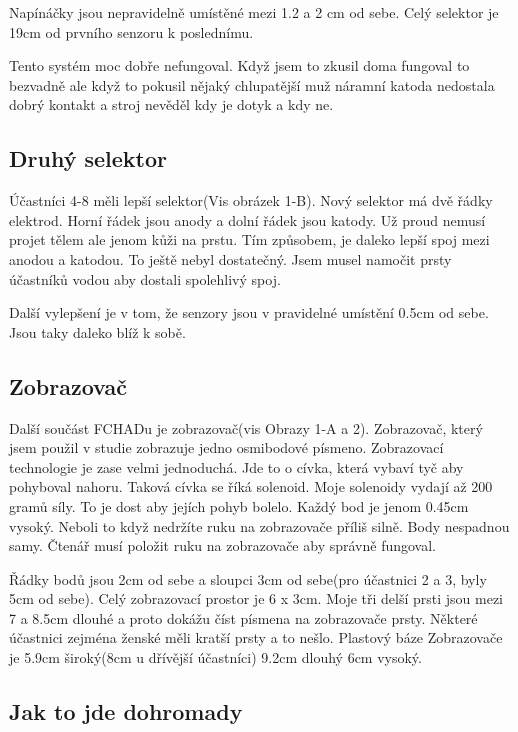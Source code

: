 Napínáčky jsou nepravidelně umístěné mezi 1.2 a 2 cm od sebe.  Celý selektor je 19cm od prvního senzoru k poslednímu.

Tento systém moc dobře nefungoval. Když jsem to zkusil doma fungoval to bezvadně ale když to pokusil nějaký chlupatější muž náramní katoda nedostala dobrý kontakt a stroj nevěděl kdy je dotyk a kdy ne.

\subsection{Druhý selektor}

Účastníci 4-8 měli lepší selektor(Vis obrázek 1-B). Nový selektor má dvě řádky elektrod. Horní řádek jsou anody a dolní řádek jsou katody.  Už proud nemusí projet tělem ale jenom kůži na prstu.  Tím způsobem, je daleko lepší spoj mezi anodou a katodou.  To ještě nebyl dostatečný.  Jsem musel namočit prsty účastníků vodou aby dostali spolehlivý spoj.

Další vylepšení je v tom, že senzory jsou v pravidelné umístění 0.5cm od sebe.  Jsou taky daleko blíž k sobě.

\subsection{Zobrazovač}
Další součást FCHADu je zobrazovač(vis Obrazy 1-A a 2).  Zobrazovač, který jsem použil v studie zobrazuje jedno osmibodové písmeno.  Zobrazovací technologie je zase velmi jednoduchá.  Jde to o cívka, která vybaví tyč aby pohyboval nahoru.  Taková cívka se říká solenoid.  Moje solenoidy vydají až 200 gramů síly\citep{multicomp}.  To je dost aby jejích pohyb bolelo.  Každý bod je jenom 0.45cm vysoký. Neboli to když nedržíte ruku na zobrazovače příliš silně.  Body nespadnou samy.  Čtenář musí položit ruku na zobrazovače aby správně fungoval.

Řádky bodů jsou 2cm od sebe a sloupci 3cm od sebe(pro účastnici 2 a 3, byly 5cm od sebe).  Celý zobrazovací prostor je 6 x 3cm.  Moje tři delší prsti jsou mezi 7 a 8.5cm dlouhé a proto dokážu číst písmena na zobrazovače prsty.  Některé účastnici zejména ženské měli kratší prsty a to nešlo.  Plastový báze Zobrazovače je 5.9cm široký(8cm u dřívější účastníci) 9.2cm dlouhý 6cm vysoký.

\subsection{Jak to jde dohromady}

